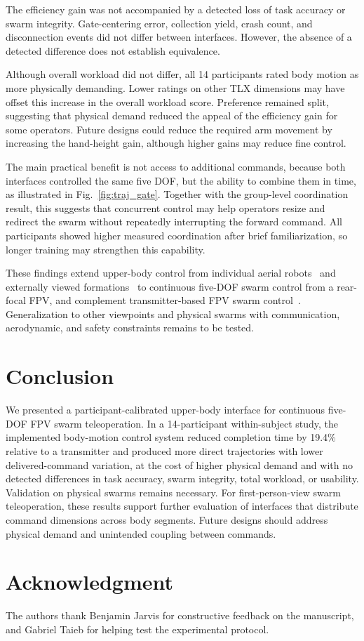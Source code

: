 \documentclass[a4paper,10pt,conference]{ieeeconf}
\begin{document}
The efficiency gain was not accompanied by a detected loss of task accuracy or swarm integrity. Gate-centering error, collection yield, crash count, and disconnection events did not differ between interfaces. However, the absence of a detected difference does not establish equivalence. 

Although overall workload did not differ, all 14 participants rated body motion
as more physically demanding. Lower ratings on other TLX dimensions may have
offset this increase in the overall workload score. Preference remained split,
suggesting that physical demand reduced the appeal of the efficiency gain for
some operators. Future designs could reduce the required arm movement by
increasing the hand-height gain, although higher gains may reduce fine control.

The main practical benefit is not access to additional commands, because both
interfaces controlled the same five DOF, but the ability to combine them in
time, as illustrated in Fig.~\ref{fig:traj_gate}. Together with the group-level
coordination result, this suggests that concurrent control may help operators resize and redirect the swarm without repeatedly interrupting the forward command. All participants showed higher measured coordination after brief familiarization, so longer training may strengthen this capability.

These findings extend upper-body control from individual aerial
robots~\cite{rognon2018flyjacket,miehlbradt2018datadriven,
macchini2024datadriven} and externally viewed
formations~\cite{macchini2021personalized,tsykunov2019swarmtouch,
kratky2025gesture} to continuous five-DOF swarm control from a rear-focal FPV,
and complement transmitter-based FPV swarm
control~\cite{ben_focaldrone}. Generalization to other
viewpoints and physical swarms with communication, aerodynamic, and safety
constraints remains to be tested.


\section{Conclusion}
We presented a participant-calibrated upper-body interface for continuous
five-DOF FPV swarm teleoperation. In a 14-participant within-subject study,
the implemented body-motion control system reduced completion time by 19.4\% relative to a transmitter and produced more direct trajectories with lower delivered-command variation, at the
cost of higher physical demand and with no detected differences in task
accuracy, swarm integrity, total workload, or usability. Validation on physical
swarms remains necessary. For first-person-view swarm teleoperation, these results support
further evaluation of interfaces that distribute command dimensions
across body segments. Future designs should address physical demand
and unintended coupling between commands.


\section*{Acknowledgment}
The authors thank Benjamin Jarvis for constructive feedback on the manuscript, and Gabriel Taieb for helping test the experimental protocol.



\end{document}
